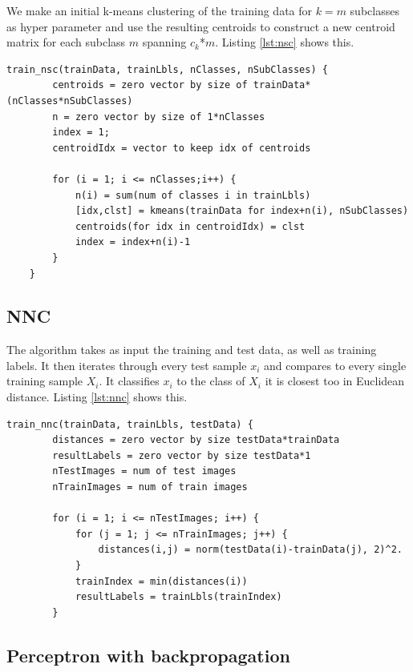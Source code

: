 \documentclass[journal]{IEEEtran}
\begin{document}
We make an initial k-means clustering of the training data for $k=m$ subclasses as hyper parameter and use the resulting centroids to construct a new centroid matrix for each subclass $m$ spanning $c_{k}$*$m$. Listing \ref{lst:nsc} shows this.

\begin{minipage}[H]{0.95\linewidth}
	\begin{lstlisting}[caption=Implementation of NSC., label={lst:nsc}]
	train_nsc(trainData, trainLbls, nClasses, nSubClasses) {
		centroids = zero vector by size of trainData*(nClasses*nSubClasses)
		n = zero vector by size of 1*nClasses
		index = 1;
		centroidIdx = vector to keep idx of centroids
	
		for (i = 1; i <= nClasses;i++) {
			n(i) = sum(num of classes i in trainLbls)
			[idx,clst] = kmeans(trainData for index+n(i), nSubClasses)
			centroids(for idx in centroidIdx) = clst
			index = index+n(i)-1
		}
	}
	\end{lstlisting}
\end{minipage}

\subsection{NNC}

The algorithm takes as input the training and test data, as well as training labels. It then iterates through every test sample $x_i$ and compares to every single training sample $X_{i}$. It classifies $x_i$ to the class of $X_{i}$ it is closest too in Euclidean distance. Listing \ref{lst:nnc} shows this.

\begin{minipage}[H]{0.95\linewidth}
	\begin{lstlisting}[caption=Implementation of NNC., label={lst:nnc}]
	train_nnc(trainData, trainLbls, testData) {
		distances = zero vector by size testData*trainData
		resultLabels = zero vector by size testData*1
		nTestImages = num of test images
		nTrainImages = num of train images
		
		for (i = 1; i <= nTestImages; i++) {
			for (j = 1; j <= nTrainImages; j++) {
				distances(i,j) = norm(testData(i)-trainData(j), 2)^2.
			}			
			trainIndex = min(distances(i))
			resultLabels = trainLbls(trainIndex)
		}
	\end{lstlisting}
\end{minipage}

\subsection{Perceptron with backpropagation} 
\end{document}
